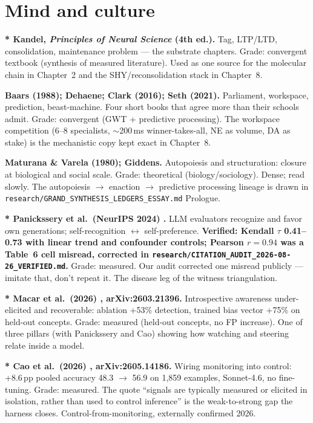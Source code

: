 \section*{Mind and culture}

\textbf{* Kandel, \textit{Principles of Neural Science} (4th ed.).} Tag, LTP/LTD, consolidation, maintenance problem --- the substrate chapters. Grade: convergent textbook (synthesis of measured literature). Used as one source for the molecular chain in Chapter~2 and the SHY/reconsolidation stack in Chapter~8.

\textbf{Baars (1988); Dehaene; Clark (2016); Seth (2021).} Parliament, workspace, prediction, beast-machine. Four short books that agree more than their schools admit. Grade: convergent (GWT + predictive processing). The workspace competition (6--8 specialists, $\sim$200\,ms winner-takes-all, NE as volume, DA as stake) is the mechanistic copy kept exact in Chapter~8.

\textbf{Maturana \& Varela (1980); Giddens.} Autopoiesis and structuration: closure at biological and social scale. Grade: theoretical (biology/sociology). Dense; read slowly. The autopoiesis $\to$ enaction $\to$ predictive processing lineage is drawn in \texttt{research/GRAND\_SYNTHESIS\_LEDGERS\_ESSAY.md} Prologue.

\textbf{* Panickssery et al.\ (NeurIPS 2024) \cite{panickssery2024}.} LLM evaluators recognize and favor own generations; self-recognition $\leftrightarrow$ self-preference. \textbf{Verified: Kendall $\tau$ 0.41--0.73 with linear trend and confounder controls; Pearson $r=0.94$ was a Table~6 cell misread, corrected in \texttt{research/CITATION\_AUDIT\_2026-08-26\_VERIFIED.md}.} Grade: measured. Our audit corrected one misread publicly --- imitate that, don't repeat it. The disease leg of the witness triangulation.

\textbf{* Macar et al.\ (2026) \cite{macar2026}, arXiv:2603.21396.} Introspective awareness under-elicited and recoverable: ablation +53\% detection, trained bias vector +75\% on held-out concepts. Grade: measured (held-out concepts, no FP increase). One of three pillars (with Panickssery and Cao) showing how watching and steering relate inside a model.

\textbf{* Cao et al.\ (2026) \cite{cao2026}, arXiv:2605.14186.} Wiring monitoring into control: +8.6\,pp pooled accuracy 48.3 $\to$ 56.9 on 1,859 examples, Sonnet-4.6, no fine-tuning. Grade: measured. The quote ``signals are typically measured or elicited in isolation, rather than used to control inference'' is the weak-to-strong gap the harness closes. Control-from-monitoring, externally confirmed 2026.

